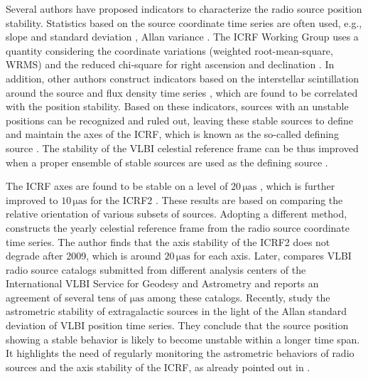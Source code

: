 \documentclass{aa}
\begin{document}
    Several authors have proposed indicators to characterize the radio source position stability.
    Statistics based on the source coordinate time series are often used, e.g., slope and standard deviation \citep{2003A&A...403..105F}, Allan variance \citep{2018A&A...618A..80G}.
    The ICRF Working Group uses a quantity considering the coordinate variations (weighted root-mean-square, WRMS) and the reduced chi-square for right ascension and declination \citep{2015AJ....150...58F,2020A&A...644A.159C}.
    In addition, other authors construct indicators based on the interstellar scintillation around the source \citep{2013MNRAS.434..585S} and flux density time series \citep[light curve;][]{2014JGeod..88..575S}, which are found to be correlated with the position stability.
    Based on these indicators, sources with an unstable positions can be recognized and ruled out, leaving these stable sources to define and maintain the axes of the ICRF, which is known as the so-called defining source \citep{2003A&A...403..105F,2006A&A...452.1107F,2009A&A...493..317L}.
    The stability of the VLBI celestial reference frame can be thus improved when a proper ensemble of stable sources are used as the defining source \citep{2004A&A...422.1105A,2017MNRAS.466.1567L}.
    
    The ICRF axes are found to be stable on a level of $\mathrm{20\,\mu as}$ \citep{1998AJ....116..516M}, which is further improved to $\mathrm{10\,\mu as}$ for the ICRF2 \citep{2015AJ....150...58F}.
    These results are based on comparing the relative orientation of various subsets of sources.
    Adopting a different method, \citet{2013A&A...553A.122L} constructs the yearly celestial reference frame from the radio source coordinate time series.
    The author finds that the axis stability of the ICRF2 does not degrade after 2009, which is around $\mathrm{20\,\mu as}$ for each axis.
    Later, \citet{2014A&A...570A.108L} compares VLBI radio source catalogs submitted from different analysis centers of the International VLBI Service for Geodesy and Astrometry \citep[IVS;][]{2017JGeod..91..711N} and reports an agreement of several tens of $\mathrm{\mu as}$ among these catalogs.
    Recently, \cite{2018A&A...618A..80G} study the astrometric stability of extragalactic sources in the light of the Allan standard deviation of VLBI position time series.
    They conclude that the source position showing a stable behavior is likely to become unstable within a longer time span.
    It highlights the need of regularly monitoring the astrometric behaviors of radio sources and the axis stability of the ICRF, as already pointed out in \citet{2013A&A...553A.122L}.
    
\end{document}
